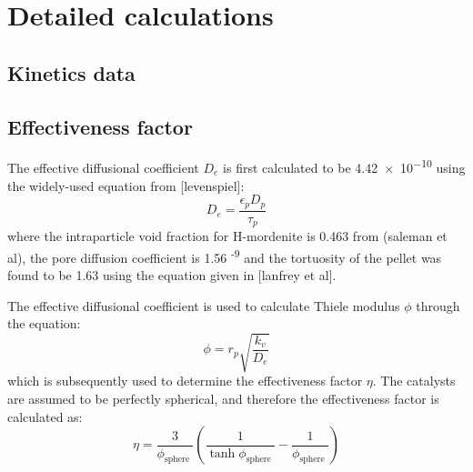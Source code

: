 \section{Detailed calculations}
\label{app:reaction}
\subsection{Kinetics data}

\begin{table}[]
\centering
\caption{Kinetic data for nitration reactions at 330K and 30\% catalyst loading}
\label{tab:kineticsdata}
\end{table}

\subsection{Effectiveness factor}

The effective diffusional coefficient $D_e$ is first calculated to be \num{4.42e-10} using the widely-used equation from [levenspiel]: 
\begin{equation}
    D_e = \frac{\epsilon_p D_p}{\tau_p}
\end{equation}
where the intraparticle void fraction for H-mordenite is 0.463 from (saleman et al), the pore diffusion coefficient is 1.56 \textsuperscript{-9} and the tortuosity of the pellet was found to be 1.63 using the equation given in [lanfrey et al]. 

The effective diffusional coefficient is used to calculate Thiele modulus $\phi$ through the equation:
\begin{equation}
    \phi = r_p \sqrt{\frac{k_v}{D_e}}
\end{equation}
which is subsequently used to determine the effectiveness factor $\eta$. The catalysts are assumed to be perfectly spherical, and therefore the effectiveness factor is calculated as: 
\begin{equation}
\eta=\frac{3}{\phi_{\text {sphere }}}\left(\frac{1}{\tanh \phi_{\text {sphere }}}-\frac{1}{\phi_{\text {sphere }}}\right)
\end{equation}

